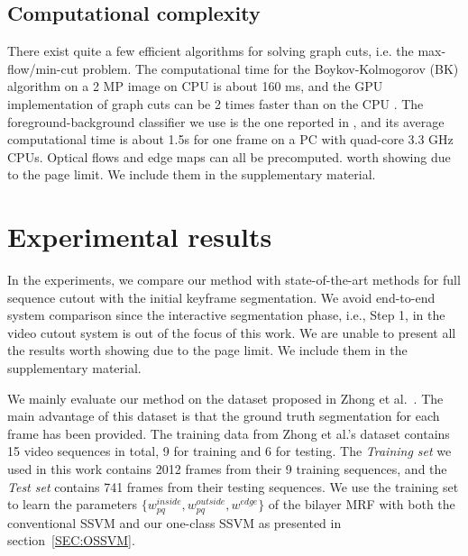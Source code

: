 \documentclass[10pt,journal,compsoc]{newIEEEtran}
\begin{document}
\subsection{Computational complexity}
There exist quite a few efficient algorithms for solving graph cuts, i.e. the max-flow/min-cut problem. The computational time for the Boykov-Kolmogorov (BK) algorithm on a 2 MP image on CPU is about 160 ms, and the GPU implementation of graph cuts can be 2 times faster than on the CPU \cite{vineet2008cuda}. The foreground-background classifier we use is the one reported in \cite{Zhong2012UDC_SIGGRAPHAsia}, and its average computational time is about 1.5s for one frame on a PC with quad-core 3.3 GHz CPUs. Optical flows and edge maps can all be precomputed.
 worth showing due to the page limit. We include them in the supplementary material.
\section{Experimental results}\label{sec:experiment}
In the experiments, we compare our method with state-of-the-art methods for full sequence cutout with the initial keyframe segmentation. We avoid end-to-end system comparison since the interactive segmentation phase, i.e., Step 1, in the video cutout system is out of the focus of this work. We are unable to present all the results worth showing due to the page limit. We include them in the supplementary material.

We mainly evaluate our method on the dataset proposed in Zhong et al.~\cite{Zhong2012UDC_SIGGRAPHAsia}. The main advantage of this dataset is that the ground truth segmentation for each frame has been provided. The training data from Zhong et al.'s dataset contains 15 video sequences in total, 9 for training and 6 for testing. The \emph{Training set} we used in this work contains 2012 frames from their 9 training sequences, and the \emph{Test set} contains 741 frames from their testing sequences.%
We use the training set to learn the parameters $\{w^{inside}_{pq},w^{outside}_{pq},w^{edge}\}$ of the bilayer MRF with both the conventional SSVM and our one-class SSVM as presented in section~\ref{SEC:OSSVM}. 
\end{document}
